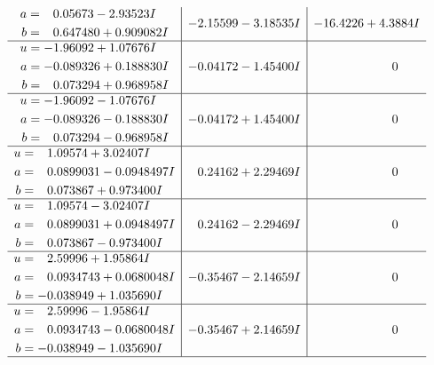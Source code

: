 \documentclass[1p]{elsarticle_modified}
\theoremstyle{definition}
\begin{document}
$$\begin{array}{c|c|c}
\begin{aligned}
a &= \phantom{-}0.05673 - 2.93523 I \\
b &= \phantom{-}0.647480 + 0.909082 I\end{aligned}
 & -2.15599 - 3.18535 I & -16.4226 + 4.3884 I \\ \hline\begin{aligned}
u &= -1.96092 + 1.07676 I \\
a &= -0.089326 + 0.188830 I \\
b &= \phantom{-}0.073294 + 0.968958 I\end{aligned}
 & -0.04172 - 1.45400 I & \phantom{-0.000000 } 0 \\ \hline\begin{aligned}
u &= -1.96092 - 1.07676 I \\
a &= -0.089326 - 0.188830 I \\
b &= \phantom{-}0.073294 - 0.968958 I\end{aligned}
 & -0.04172 + 1.45400 I & \phantom{-0.000000 } 0 \\ \hline\begin{aligned}
u &= \phantom{-}1.09574 + 3.02407 I \\
a &= \phantom{-}0.0899031 - 0.0948497 I \\
b &= \phantom{-}0.073867 + 0.973400 I\end{aligned}
 & \phantom{-}0.24162 + 2.29469 I & \phantom{-0.000000 } 0 \\ \hline\begin{aligned}
u &= \phantom{-}1.09574 - 3.02407 I \\
a &= \phantom{-}0.0899031 + 0.0948497 I \\
b &= \phantom{-}0.073867 - 0.973400 I\end{aligned}
 & \phantom{-}0.24162 - 2.29469 I & \phantom{-0.000000 } 0 \\ \hline\begin{aligned}
u &= \phantom{-}2.59996 + 1.95864 I \\
a &= \phantom{-}0.0934743 + 0.0680048 I \\
b &= -0.038949 + 1.035690 I\end{aligned}
 & -0.35467 - 2.14659 I & \phantom{-0.000000 } 0 \\ \hline\begin{aligned}
u &= \phantom{-}2.59996 - 1.95864 I \\
a &= \phantom{-}0.0934743 - 0.0680048 I \\
b &= -0.038949 - 1.035690 I\end{aligned}
 & -0.35467 + 2.14659 I & \phantom{-0.000000 } 0\\
 \hline 
 \end{array}$$\newpage\newpage\renewcommand{\arraystretch}{1}
\end{document}
